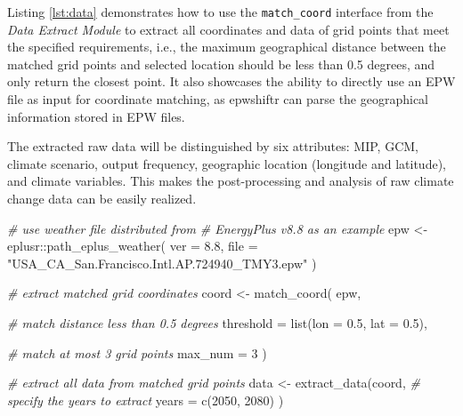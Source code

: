 \documentclass[twocolumn, a4paper,10pt]{article}
\newenvironment{Shaded}{\begin{mdframed}[skipabove=0pt]}{\end{mdframed}}
\newcommand{\AttributeTok}[1]{\textcolor[rgb]{0.77,0.63,0.00}{#1}}
\newcommand{\CommentTok}[1]{\textcolor[rgb]{0.56,0.35,0.01}{\textit{#1}}}
\newcommand{\DecValTok}[1]{\textcolor[rgb]{0.00,0.00,0.81}{#1}}
\newcommand{\FloatTok}[1]{\textcolor[rgb]{0.00,0.00,0.81}{#1}}
\newcommand{\FunctionTok}[1]{\textcolor[rgb]{0.00,0.00,0.00}{#1}}
\newcommand{\NormalTok}[1]{#1}
\newcommand{\OtherTok}[1]{\textcolor[rgb]{0.56,0.35,0.01}{#1}}
\newcommand{\SpecialCharTok}[1]{\textcolor[rgb]{0.00,0.00,0.00}{#1}}
\newcommand{\StringTok}[1]{\textcolor[rgb]{0.31,0.60,0.02}{#1}}
\begin{document}
Listing \ref{lst:data} demonstrates how to use the \texttt{match\_coord} interface from
the \emph{Data Extract Module} to extract all coordinates and data of grid points that
meet the specified requirements, i.e., the maximum geographical distance between
the matched grid points and selected location should be less than 0.5 degrees,
and only return the closest point. It also showcases the ability to directly
use an EPW file as input for coordinate matching, as epwshiftr can parse the
geographical information stored in EPW files.

The extracted raw data will be distinguished by six attributes: MIP, GCM,
climate scenario, output frequency, geographic location (longitude and latitude),
and climate variables. This makes the post-processing and analysis of raw
climate change data can be easily realized.

\label{lst:data}

\begin{Shaded}
\begin{Highlighting}[]
\CommentTok{\# use weather file distributed from}
\CommentTok{\# EnergyPlus v8.8 as an example}
\NormalTok{epw }\OtherTok{\textless{}{-}}\NormalTok{ eplusr}\SpecialCharTok{::}\FunctionTok{path\_eplus\_weather}\NormalTok{(}
  \AttributeTok{ver =} \FloatTok{8.8}\NormalTok{,}
  \AttributeTok{file =} \StringTok{"USA\_CA\_San.Francisco.Intl.AP.724940\_TMY3.epw"}
\NormalTok{)}

\CommentTok{\# extract matched grid coordinates}
\NormalTok{coord }\OtherTok{\textless{}{-}} \FunctionTok{match\_coord}\NormalTok{(}
\NormalTok{  epw,}

  \CommentTok{\# match distance less than 0.5 degrees}
  \AttributeTok{threshold =} \FunctionTok{list}\NormalTok{(}\AttributeTok{lon =} \FloatTok{0.5}\NormalTok{, }\AttributeTok{lat =} \FloatTok{0.5}\NormalTok{),}

  \CommentTok{\# match at most 3 grid points}
  \AttributeTok{max\_num =} \DecValTok{3}
\NormalTok{)}

\CommentTok{\# extract all data from matched grid points}
\NormalTok{data }\OtherTok{\textless{}{-}} \FunctionTok{extract\_data}\NormalTok{(coord,}
  \CommentTok{\# specify the years to extract}
  \AttributeTok{years =} \FunctionTok{c}\NormalTok{(}\DecValTok{2050}\NormalTok{, }\DecValTok{2080}\NormalTok{)}
\NormalTok{)}
\end{Highlighting}
\end{Shaded}
\end{document}
